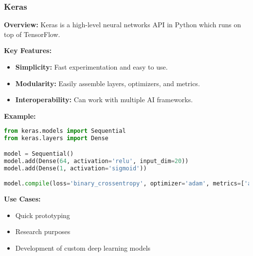 \documentclass[aspectratio=169]{beamer}
\begin{document}
\begin{frame}[fragile]
    \frametitle{Keras}
    \textbf{Overview:} Keras is a high-level neural networks API in Python which runs on top of TensorFlow.

    \textbf{Key Features:}
    \begin{itemize}
        \item \textbf{Simplicity:} Fast experimentation and easy to use.
        \item \textbf{Modularity:} Easily assemble layers, optimizers, and metrics.
        \item \textbf{Interoperability:} Can work with multiple AI frameworks.
    \end{itemize}

    \textbf{Example:}
    \begin{lstlisting}[language=Python]
from keras.models import Sequential
from keras.layers import Dense

model = Sequential()
model.add(Dense(64, activation='relu', input_dim=20))
model.add(Dense(1, activation='sigmoid'))

model.compile(loss='binary_crossentropy', optimizer='adam', metrics=['accuracy'])
    \end{lstlisting}

    \textbf{Use Cases:}
    \begin{itemize}
        \item Quick prototyping
        \item Research purposes
        \item Development of custom deep learning models
    \end{itemize}
\end{frame}
\end{document}
